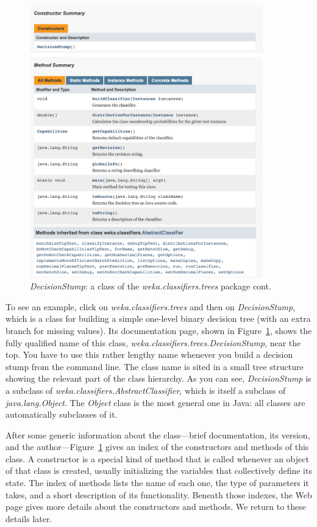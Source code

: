 \begin{figure}[!thp]
\ContinuedFloat
\centering
\includegraphics[width=0.9\textwidth]{images/B5_2b.png}
\caption{\textit{DecisionStump}: a class of the \textit{weka.classifiers.trees} package cont.}
\label{fig:javadoc_decisionstump}
\end{figure}

To see an example, click on \textit{weka.classifiers.trees} and then on
\textit{DecisionStump}, which is a class for building a simple one-level binary
decision tree (with an extra branch for missing values). Its
documentation page, shown in Figure~\ref{fig:javadoc_decisionstump},
shows the fully qualified name of this class,
\textit{weka.classifiers.trees.DecisionStump}, near the top. You have to use
this rather lengthy name whenever you build a decision stump from the
command line. The class name is sited in a small tree structure
showing the relevant part of the class hierarchy. As you can see,
\textit{DecisionStump} is a subclass of \textit{weka.classifiers.AbstractClassifier},
which is itself a subclass
of \textit{java.lang.Object}. The \textit{Object} class is the most
general one in Java: all classes are automatically subclasses of it.

After some generic information about the class—brief documentation,
its version, and the author---Figure~\ref{fig:javadoc_decisionstump}
gives an index of the constructors and methods of this class. A
constructor is a special kind of method that is called whenever an
object of that class is created, usually initializing the variables
that collectively define its state. The index of methods lists the
name of each one, the type of parameters it takes, and a short
description of its functionality. Beneath those indexes, the Web page
gives more details about the constructors and methods. We return to
these details later.

